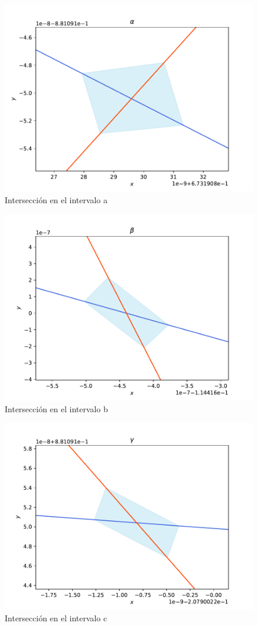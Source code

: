\begin{figure}[H]
\centering
\includegraphics[scale=0.4]{cruce_a}
\caption{Intersección en el intervalo a}
\label{jung_corte1}
\end{figure}


\begin{figure}[H]
\centering
\includegraphics[scale=0.4]{cruce_b}
\caption{Intersección en el intervalo b}
\label{jung_corte2}
\end{figure}


\begin{figure}[H]
\centering
\includegraphics[scale=0.4]{cruce_c}
\caption{Intersección en el intervalo c}
\label{jung_corte3}
\end{figure}



